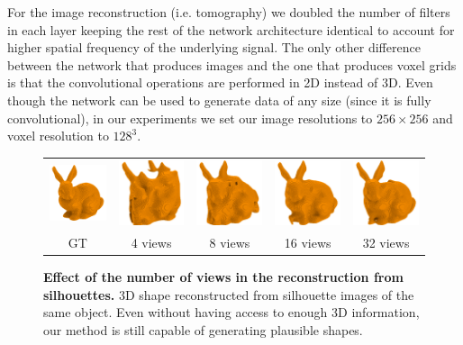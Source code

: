 For the image reconstruction (i.e. tomography) we doubled the number of filters in each layer keeping the rest of the network architecture identical to account for higher spatial frequency of the underlying signal.
The only other difference between the network that produces images and the one that produces
voxel grids is that the convolutional operations are performed in 2D instead of 3D.
Even though the network can be used to generate data of any size (since it is fully convolutional),
in our experiments we set our image resolutions to $256\times256$ and voxel resolution to $128^3$.

\begin{figure}[t]
\centering
\setlength{\tabcolsep}{0pt}
\begin{tabular}{c|cccc}
\includegraphics[width=.2\linewidth]{dsp/figs/gt.png} &
\includegraphics[width=.2\linewidth]{dsp/figs/bunny_deep_4binary.png} &
\includegraphics[width=.2\linewidth]{dsp/figs/bunny_deep_8binary.png} &
\includegraphics[width=.2\linewidth]{dsp/figs/bunny_deep_16binary.png} &
\includegraphics[width=.2\linewidth]{dsp/figs/bunny_deep_32binary.png}\\
GT &
4 views &
8 views&
16 views&
32 views
\end{tabular}
    \caption{\small \label{fig:binview} \textbf{Effect of the number of views in the reconstruction from silhouettes.}
		3D shape reconstructed from silhouette images of the same object.
		Even without having access to enough 3D information, our method is still capable of generating
		plausible shapes.
    }
\end{figure}


